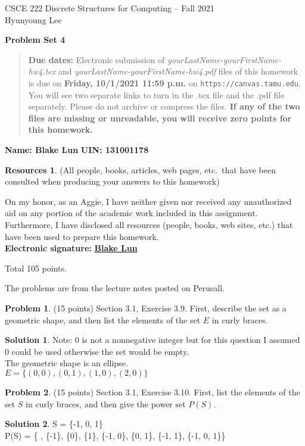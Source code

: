 \documentclass{article}
\theoremstyle{definition}
\newtheorem{problem}{Problem}
\newtheorem*{solution}{Solution}
\newtheorem*{resources}{Resources}
\newcommand{\name}[2]{\noindent\textbf{Name: #1}\hfill \textbf{UIN: #2}}
\newcommand{\honor}{\noindent On my honor, as an Aggie, I have neither
  given nor received any unauthorized aid on any portion of the
  academic work included in this assignment. Furthermore, I have
  disclosed all resources (people, books, web sites, etc.) that have
  been used to prepare this homework. \\[2ex]
 \textbf{Electronic signature:} \underline{ \textbf{Blake Lun} } }
\newcommand{\problemset}[1]{\begin{center}\textbf{Problem Set #1}\end{center}}
\newcommand{\duedate}[1]{\begin{quote}\textbf{Due dates:} Electronic
    submission of \textsl{yourLastName-yourFirstName-hw4.tex} and 
    \textsl{yourLastName-yourFirstName-hw4.pdf} files of this homework is due on
    \textbf{#1} on \texttt{https://canvas.tamu.edu}. You will see two separate links
    to turn in the .tex file and the .pdf file separately. Please do not archive or compress the files.  
    \textbf{If any of the two files are missing or unreadable, you will receive zero points for this
    homework.}\end{quote} }
\begin{document}
\vspace*{-20mm}
\begin{center}
{\large
CSCE 222 Discrete Structures for Computing -- Fall 2021\\[.5ex]
Hyunyoung Lee\\}
\end{center}
\problemset{4}
\duedate{Friday, 10/1/2021 11:59 p.m.}
\name{ Blake Lun }{ 131001178 }
\begin{resources} (All people, books, articles, web pages, etc.\ that
  have been consulted when producing your answers to this homework)
\end{resources}
\honor

\bigskip

\noindent
Total 105 points.

\bigskip

\noindent
The problems are from the lecture notes posted on Perusall.

\medskip

\begin{problem} (15 points) Section 3.1, Exercise 3.9.  First, describe the set
as a geometric shape, and then list the elements of the set $E$ in curly braces.  
\end{problem}
\begin{solution} 
Note: 0 is not a nonnegative integer but for this question I assumed 0 could be used otherwise the set would be empty. \\
The geometric shape is an ellipse. \\
$E = \{ (0,0), (0, 1), (1, 0), (2, 0) \}$
\end{solution}

\begin{problem} (15 points) Section 3.1, Exercise 3.10.  First, list the elements of 
the set $S$ in curly braces, and then give the power set $P(S)$.
\end{problem}
\begin{solution} 
S = \{-1, 0, 1\}  \\
P(S) = \{ \varnothing, \{-1\}, \{0\}, \{1\}, \{-1, 0\}, \{0, 1\}, \{-1, 1\}, \{-1, 0, 1\}\}
\end{solution}
\end{document}
